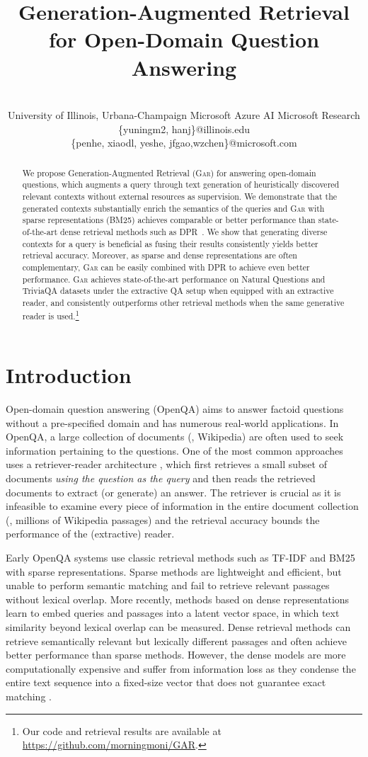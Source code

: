 \documentclass[11pt,a4paper]{article}
\title{Generation-Augmented Retrieval for Open-Domain Question Answering}
\author{\makecell{Yuning Mao\thanks{\hspace{.06in}Work was done during internship at Microsoft Azure AI.}, Pengcheng He, Xiaodong Liu, Yelong Shen,\\ Jianfeng Gao, Jiawei Han, Weizhu Chen} \\
University of Illinois, Urbana-Champaign \quad
Microsoft Azure AI \quad
Microsoft Research\\
\{yuningm2, hanj\}@illinois.edu \\ \{penhe, xiaodl, yeshe, jfgao,wzchen\}@microsoft.com 
}
\date{}
\newcommand{\ours}{\textsc{Gar}\xspace}
\begin{document}
\maketitle
\begin{abstract}
We propose Generation-Augmented Retrieval (\ours) for answering open-domain questions, which augments a query through text generation of heuristically discovered relevant contexts without external resources as supervision. 
We demonstrate that the generated contexts substantially enrich the semantics of the queries and \ours with sparse representations (BM25) achieves comparable or better performance than state-of-the-art dense retrieval methods such as DPR~\cite{karpukhin2020dense}.
We show that generating diverse contexts for a query is beneficial as fusing their results consistently yields better retrieval accuracy.
Moreover, as sparse and dense representations are often complementary, \ours can be easily combined with DPR to achieve even better performance.
\ours achieves state-of-the-art performance on Natural Questions and TriviaQA datasets under the extractive QA setup when equipped with an extractive reader, and consistently outperforms other retrieval methods when the same generative reader is used.\footnote{Our code and retrieval results are available at \url{https://github.com/morningmoni/GAR}.}
\end{abstract}

\section{Introduction}
Open-domain question answering (OpenQA) aims to answer factoid questions without a pre-specified domain and has numerous real-world applications.
In OpenQA, a large collection of documents (\eg, Wikipedia) are often used to seek information pertaining to the questions.
One of the most common approaches uses a retriever-reader architecture \cite{chen-etal-2017-reading}, which first retrieves a small subset of documents \textit{using the question as the query} and then reads the retrieved documents to extract (or generate) an answer.
The retriever is crucial as it is infeasible to examine every piece of information in the entire document collection (\eg, millions of Wikipedia passages) and the retrieval accuracy bounds the performance of the (extractive) reader.

Early OpenQA systems \cite{chen-etal-2017-reading} use classic retrieval methods such as TF-IDF and BM25 with sparse representations. Sparse methods are lightweight and efficient, but unable to perform semantic matching and fail to retrieve relevant passages without lexical overlap.
More recently, methods based on dense representations \cite{guu2020realm,karpukhin2020dense} learn to embed queries and passages into a latent vector space, in which text similarity beyond lexical overlap can be measured.
Dense retrieval methods can retrieve semantically relevant but lexically different passages and often achieve better performance than sparse methods.
However, the dense models are more computationally expensive and suffer from information loss
as they condense the entire text sequence into a fixed-size vector
that does not guarantee exact matching \cite{luan2020sparse}.
\end{document}
